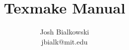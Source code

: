 \title{Texmake Manual}
\author{Josh Bialkowski \\ \small jbialk@mit.edu}
    
\pagestyle{plain}


 


\maketitle







  
